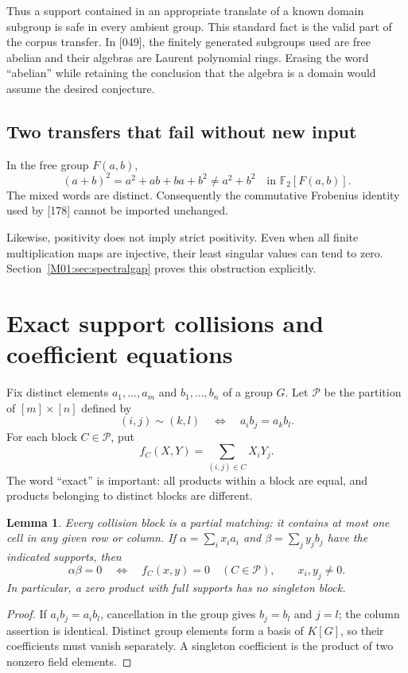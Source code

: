 \documentclass[11pt,a4paper,oneside]{report}
\newtheorem{lemma}[theorem]{Lemma}
\theoremstyle{definition}
\theoremstyle{remark}
\newcommand{\F}{\mathbb F}
\begin{document}
Thus a support contained in an appropriate translate of a known domain
subgroup is safe in every ambient group. This standard fact is the valid
part of the corpus transfer. In [049], the finitely generated subgroups used are free
abelian and their algebras are Laurent polynomial rings. Erasing the word
``abelian'' while retaining the conclusion that the algebra is a domain
would assume the desired conjecture.

\subsection{Two transfers that fail without new input}

In the free group $F(a,b)$,
\[
(a+b)^2=a^2+ab+ba+b^2\ne a^2+b^2
\quad\text{in }\F_2[F(a,b)].
\]
The mixed words are distinct. Consequently the commutative Frobenius
identity used by [178] cannot be imported unchanged.

Likewise, positivity does not imply strict positivity. Even when all finite
multiplication maps are injective, their least singular values can tend to
zero. Section~\ref{M01:sec:spectralgap} proves this obstruction explicitly.

\section{Exact support collisions and coefficient equations}\label{M01:sec:collision}

Fix distinct elements $a_1,\ldots,a_m$ and $b_1,\ldots,b_n$ of a group
$G$. Let $\mathcal P$ be the partition of $[m]\times[n]$ defined by
\[
(i,j)\sim(k,l)\quad\Longleftrightarrow\quad a_i b_j=a_k b_l.
\]
For each block $C\in\mathcal P$, put
\begin{equation}\label{M01:eq:collisionpoly}
f_C(X,Y)=\sum_{(i,j)\in C}X_iY_j.
\end{equation}
The word ``exact'' is important: all products within a block are equal,
and products belonging to distinct blocks are different.

\begin{lemma}\label{M01:lem:matching}
Every collision block is a partial matching: it contains at most one cell
in any given row or column. If $\alpha=\sum_i x_i a_i$ and
$\beta=\sum_j y_j b_j$ have the indicated supports, then
\[
\alpha\beta=0\quad\Longleftrightarrow\quad
f_C(x,y)=0\quad(C\in\mathcal P),
\qquad x_i,y_j\ne0.
\]
In particular, a zero product with full supports has no singleton block.
\end{lemma}
\begin{proof}
If $a_i b_j=a_i b_l$, cancellation in the group gives $b_j=b_l$ and
$j=l$; the column assertion is identical. Distinct group elements form a
basis of $K[G]$, so their coefficients must vanish separately. A singleton
coefficient is the product of two nonzero field elements.
\end{proof}
\end{document}
